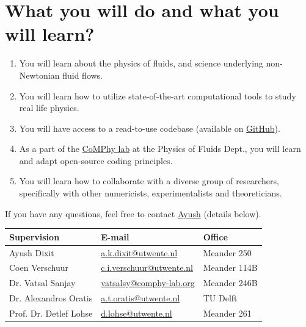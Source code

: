 \documentclass[a4paper,10pt]{article}
\begin{document}
\section*{What you will do and what you will learn?}

\begin{enumerate}
\item You will learn about the physics of fluids, and science underlying non-Newtonian fluid flows. 
\item You will learn how to utilize state-of-the-art computational tools to study real life physics. 
\item You will have access to a read-to-use codebase (available on \href{https://github.com/comphy-lab/Viscoelastic-Worthington-jets-and-droplets-produced-by-bursting-bubbles}{GitHub}).
\item As a part of the \href{https://comphy-lab.org}{CoMPhy lab} at the Physics of Fluids Dept., you will learn and adapt open-source coding principles. 
\item You will learn how to collaborate with a diverse group of researchers, specifically with other numericists, experimentalists and theoreticians.

\end{enumerate}

If you have any questions, feel free to contact \href{mailto:a.k.dixit@utwente.nl}{Ayush} (details below).
\begin{center}
\begin{tabular}{|l|l|l|}
\hline \textbf{Supervision} & \textbf{E-mail} & \textbf{Office} \\
\hline Ayush Dixit & \href{mailto:a.k.dixit@utwente.nl}{a.k.dixit@utwente.nl} & Meander 250 \\
\hline Coen Verschuur & \href{mailto:c.i.verschuur@utwente.nl}{c.i.verschuur@utwente.nl} & Meander 114B \\
\hline Dr. Vatsal Sanjay & \href{mailto:vatsalsy@comphy-lab.org}{vatsalsy@comphy-lab.org} & Meander 246B \\
\hline Dr. Alexandros Oratis   & \href{mailto:a.t.oratis@utwente.nl}{a.t.oratis@utwente.nl}& TU Delft \\
\hline Prof. Dr. Detlef Lohse & \href{mailto:d.lohse@utwente.nl}{d.lohse@utwente.nl} & Meander 261  \\
\hline
\end{tabular}
\end{center}
\printbibliography
\end{document}
